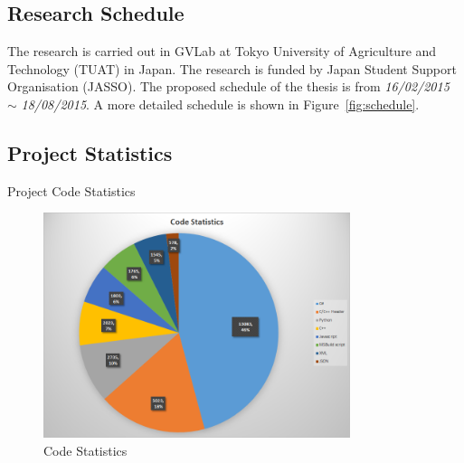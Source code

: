\subsection*{Research Schedule}
	The research is carried out in GVLab at Tokyo University of Agriculture and Technology (TUAT) in Japan. The research is funded by Japan Student Support Organisation (JASSO). The proposed schedule of the thesis is from \emph{16/02/2015} $\sim$ \emph{18/08/2015}. A more detailed schedule is shown in Figure~\ref{fig:schedule}.
	
\subsection{Project Statistics}

\begin{table}[h!]
  \begin{center}
    \caption{Project Code Statistics}
    \label{table:code_stats}
  \end{center}
\end{table}

\begin{figure}
\centering
\includegraphics[width=0.8\textwidth]{assets/code_statistics.png}
\caption{Code Statistics}
\label{fig:program}
\end{figure}  

